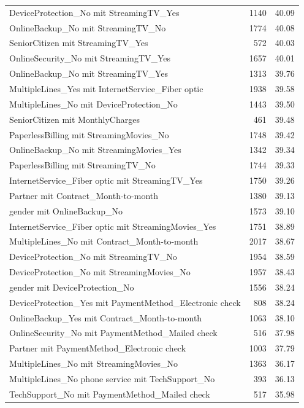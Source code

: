 \documentclass[a4paper,11pt]{article}
\begin{document}
\begin{longtable}{p{9cm}rr}
DeviceProtection\_No mit StreamingTV\_Yes & 1140 & 40.09 \\
OnlineBackup\_No mit StreamingTV\_No & 1774 & 40.08 \\
SeniorCitizen mit StreamingTV\_Yes & 572 & 40.03 \\
OnlineSecurity\_No mit StreamingTV\_Yes & 1657 & 40.01 \\
OnlineBackup\_No mit StreamingTV\_Yes & 1313 & 39.76 \\
MultipleLines\_Yes mit InternetService\_Fiber optic & 1938 & 39.58 \\
MultipleLines\_No mit DeviceProtection\_No & 1443 & 39.50 \\
SeniorCitizen mit MonthlyCharges & 461 & 39.48 \\
PaperlessBilling mit StreamingMovies\_No & 1748 & 39.42 \\
OnlineBackup\_No mit StreamingMovies\_Yes & 1342 & 39.34 \\
PaperlessBilling mit StreamingTV\_No & 1744 & 39.33 \\
InternetService\_Fiber optic mit StreamingTV\_Yes & 1750 & 39.26 \\
Partner mit Contract\_Month-to-month & 1380 & 39.13 \\
gender mit OnlineBackup\_No & 1573 & 39.10 \\
InternetService\_Fiber optic mit StreamingMovies\_Yes & 1751 & 38.89 \\
MultipleLines\_No mit Contract\_Month-to-month & 2017 & 38.67 \\
DeviceProtection\_No mit StreamingTV\_No & 1954 & 38.59 \\
DeviceProtection\_No mit StreamingMovies\_No & 1957 & 38.43 \\
gender mit DeviceProtection\_No & 1556 & 38.24 \\
DeviceProtection\_Yes mit PaymentMethod\_Electronic check & 808 & 38.24 \\
OnlineBackup\_Yes mit Contract\_Month-to-month & 1063 & 38.10 \\
OnlineSecurity\_No mit PaymentMethod\_Mailed check & 516 & 37.98 \\
Partner mit PaymentMethod\_Electronic check & 1003 & 37.79 \\
MultipleLines\_No mit StreamingMovies\_No & 1363 & 36.17 \\
MultipleLines\_No phone service mit TechSupport\_No & 393 & 36.13 \\
TechSupport\_No mit PaymentMethod\_Mailed check & 517 & 35.98 \\

\end{longtable}
\end{document}
